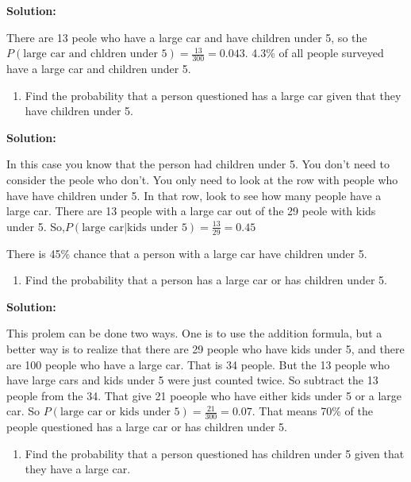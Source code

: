 \documentclass[
]{book}
\providecommand{\tightlist}{%
  \setlength{\itemsep}{0pt}\setlength{\parskip}{0pt}}
\begin{document}
\textbf{Solution:}

There are 13 peole who have a large car and have children under 5, so the \(P(\text{large car and chldren under 5})=\frac{13}{300}=0.043\). 4.3\% of all people surveyed have a large car and children under 5.

\begin{enumerate}
\def\labelenumi{\alph{enumi}.}
\setcounter{enumi}{3}
\tightlist
\item
  Find the probability that a person questioned has a large car given that they have children under 5.
\end{enumerate}

\textbf{Solution:}

In this case you know that the person had children under 5. You don't need to consider the peole who don't. You only need to look at the row with people who have have children under 5. In that row, look to see how many people have a large car. There are 13 people with a large car out of the 29 peole with kids under 5. So,\(P(\text{large car|kids under 5})=\frac{13}{29}=0.45\)

There is 45\% chance that a person with a large car have children under 5.

\begin{enumerate}
\def\labelenumi{\alph{enumi}.}
\setcounter{enumi}{4}
\tightlist
\item
  Find the probability that a person has a large car or has children under 5.
\end{enumerate}

\textbf{Solution:}

This prolem can be done two ways. One is to use the addition formula, but a better way is to realize that there are 29 people who have kids under 5, and there are 100 people who have a large car. That is 34 people. But the 13 people who have large cars and kids under 5 were just counted twice. So subtract the 13 people from the 34. That give 21 poeople who have either kids under 5 or a large car. So \(P(\text{large car or kids under 5})=\frac{21}{300}=0.07\). That means 70\% of the people questioned has a large car or has children under 5.

\begin{enumerate}
\def\labelenumi{\alph{enumi}.}
\setcounter{enumi}{5}
\tightlist
\item
  Find the probability that a person questioned has children under 5 given that they have a large car.
\end{enumerate}
\end{document}
